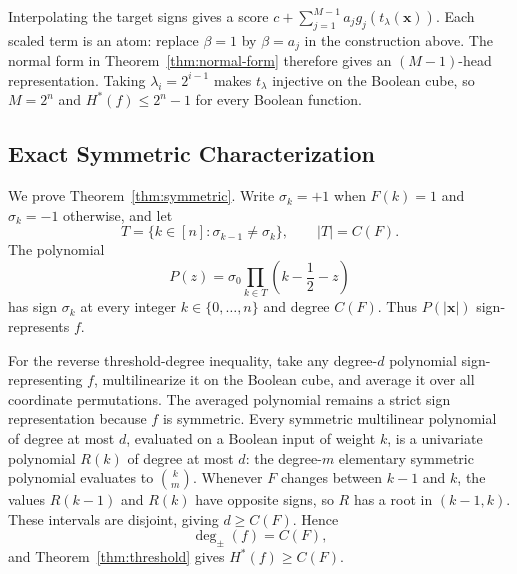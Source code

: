 \documentclass{article}
\theoremstyle{definition}
\theoremstyle{plain}
\newcommand{\hstar}{H^{\ast}}
\newcommand{\tdeg}{\deg_{\pm}}
\newcommand{\signchanges}{C(F)}
\begin{document}
Interpolating the target signs gives a score $c+\sum_{j=1}^{M-1}a_jg_j(t_\lambda(\mathbf{x}))$. Each scaled term is an atom: replace $\beta=1$ by $\beta=a_j$ in the construction above. The normal form in Theorem~\ref{thm:normal-form} therefore gives an $(M-1)$-head representation. Taking $\lambda_i=2^{i-1}$ makes $t_\lambda$ injective on the Boolean cube, so $M=2^n$ and $\hstar(f)\leq2^n-1$ for every Boolean function.

\subsection{Exact Symmetric Characterization}
\label{app:proof-symmetric}

We prove Theorem~\ref{thm:symmetric}. Write $\sigma_k=+1$ when $F(k)=1$ and $\sigma_k=-1$ otherwise, and let
\begin{equation}
T=\{k\in[n]:\sigma_{k-1}\neq\sigma_k\},
\qquad |T|=\signchanges.
\end{equation}
The polynomial
\begin{equation}
P(z)=\sigma_0\prod_{k\in T}\left(k-\frac12-z\right)
\label{eq:symmetric-sign-polynomial}
\end{equation}
has sign $\sigma_k$ at every integer $k\in\{0,\ldots,n\}$ and degree $\signchanges$. Thus $P(|\mathbf{x}|)$ sign-represents $f$.

For the reverse threshold-degree inequality, take any degree-$d$ polynomial sign-representing $f$, multilinearize it on the Boolean cube, and average it over all coordinate permutations. The averaged polynomial remains a strict sign representation because $f$ is symmetric. Every symmetric multilinear polynomial of degree at most $d$, evaluated on a Boolean input of weight $k$, is a univariate polynomial $R(k)$ of degree at most $d$: the degree-$m$ elementary symmetric polynomial evaluates to $\binom{k}{m}$. Whenever $F$ changes between $k-1$ and $k$, the values $R(k-1)$ and $R(k)$ have opposite signs, so $R$ has a root in $(k-1,k)$. These intervals are disjoint, giving $d\geq\signchanges$. Hence
\begin{equation}
\tdeg(f)=\signchanges,
\end{equation}
and Theorem~\ref{thm:threshold} gives $\hstar(f)\geq\signchanges$.
\end{document}
